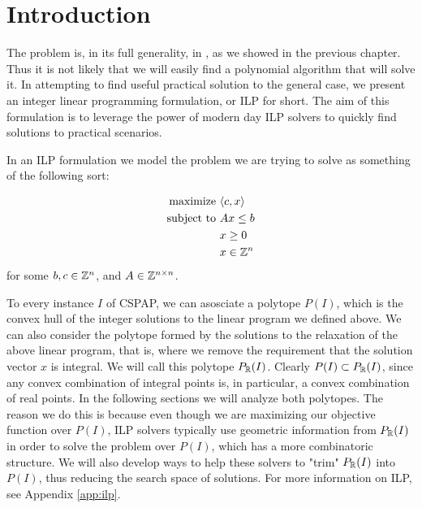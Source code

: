 \section{Introduction}
The problem is, in its full generality, in \npc, as we showed in the previous chapter. Thus it is not likely that we will easily find a polynomial algorithm that will solve it. In attempting to find useful practical solution to the general case, we present an integer linear programming formulation, or ILP for short. The aim of this formulation is to leverage the power of modern day ILP solvers to quickly find solutions to practical scenarios.

In an ILP formulation we model the problem we are trying to solve as something of the following sort:

\begin{alignat*}{2}
\text{maximize } & \langle c, x \rangle\\
\text{subject to } & A x \le b\\
                   & x \ge 0\\
                   & x \in \mathbb{Z}^n
\end{alignat*}
for some $b, c \in \mathbb{Z}^n$, and $A \in \mathbb{Z}^{n \times n}$.

To every instance $I$ of CSPAP, we can asosciate a polytope $P(I)$, which is the convex hull of the integer solutions to the linear program we defined above. We can also consider the polytope formed by the solutions to the relaxation of the above linear program, that is, where we remove the requirement that the solution vector $x$ is integral. We will call this polytope $P_{\mathbb{R}}(I)$. Clearly  $P(I) \subset P_{\mathbb{R}}(I)$, since any convex combination of integral points is, in particular, a convex combination of real points. In the following sections we will analyze both polytopes. The reason we do this is because even though we are maximizing our objective function over $P(I)$, ILP solvers typically use geometric information from $P_{\mathbb{R}}(I)$ in order to solve the problem over $P(I)$, which has a more combinatoric structure. We will also develop ways to help these solvers to "trim" $P_{\mathbb{R}}(I)$ into $P(I)$, thus reducing the search space of solutions. For more information on ILP, see Appendix \ref{app:ilp}.
